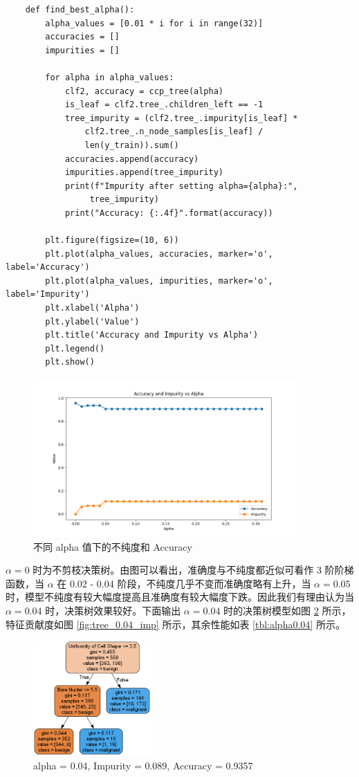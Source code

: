 \documentclass[a4paper,12pt,onecolumn,oneside]{article}
\begin{document}
	\lstset{language=Python}
	\lstset{frame=lines}
	\lstset{basicstyle=\footnotesize}
	\begin{lstlisting}
	def find_best_alpha():
		alpha_values = [0.01 * i for i in range(32)]
		accuracies = []
		impurities = []
		
		for alpha in alpha_values:
			clf2, accuracy = ccp_tree(alpha)
			is_leaf = clf2.tree_.children_left == -1
			tree_impurity = (clf2.tree_.impurity[is_leaf] * 
				clf2.tree_.n_node_samples[is_leaf] / 
				len(y_train)).sum()
			accuracies.append(accuracy)
			impurities.append(tree_impurity)
			print(f"Impurity after setting alpha={alpha}:",
				 tree_impurity)
			print("Accuracy: {:.4f}".format(accuracy))
		
		plt.figure(figsize=(10, 6))
		plt.plot(alpha_values, accuracies, marker='o', label='Accuracy')
		plt.plot(alpha_values, impurities, marker='o', label='Impurity')
		plt.xlabel('Alpha')
		plt.ylabel('Value')
		plt.title('Accuracy and Impurity vs Alpha')
		plt.legend()
		plt.show()
	\end{lstlisting}
	\begin{figure}[H]
		\centering
		\includegraphics[width=0.9\textwidth]{res3/accimp.png}
		\caption{不同 alpha 值下的不纯度和 Accuracy}
		\label{fig:acc}
	\end{figure}
	$\alpha = 0$ 时为不剪枝决策树。由图可以看出，准确度与不纯度都近似可看作 3 阶阶梯函数，当 $\alpha$ 在 0.02 - 0.04 阶段，不纯度几乎不变而准确度略有上升，当 $\alpha = 0.05$ 时，模型不纯度有较大幅度提高且准确度有较大幅度下跌。因此我们有理由认为当 $\alpha = 0.04$ 时，决策树效果较好。下面输出 $\alpha = 0.04$ 时的决策树模型如图 \ref{fig:tree_0.04} 所示，特征贡献度如图 \ref{fig:tree_0.04_imp} 所示，其余性能如表 \ref{tbl:alpha0.04} 所示。
	\begin{figure}[H]
		\centering
		\includegraphics[width=0.4\textwidth]{res3/trees/tree_0.04.png}
		\caption{alpha = 0.04, Impurity = 0.089, Accuracy = 0.9357}
		\label{fig:tree_0.04}
	\end{figure}
	
\end{document}
